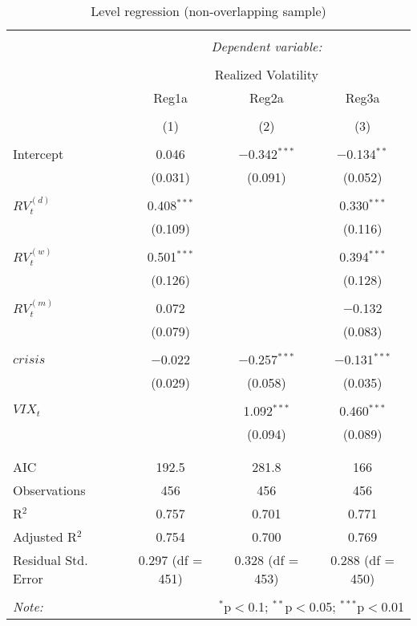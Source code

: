 
\begin{table}[!htbp] \centering 
  \caption{Level regression (non-overlapping sample)} 
  \label{overlap1} 
\begin{tabular}{@{\extracolsep{5pt}}lccc} 
\\[-1.8ex]\hline 
\hline \\[-1.8ex] 
 & \multicolumn{3}{c}{\textit{Dependent variable:}} \\ 
\cline{2-4} 
\\[-1.8ex] & \multicolumn{3}{c}{Realized Volatility} \\ 
 & Reg1a & Reg2a & Reg3a \\ 
\\[-1.8ex] & (1) & (2) & (3)\\ 
\hline \\[-1.8ex] 
 Intercept & 0.046 & $-$0.342$^{***}$ & $-$0.134$^{**}$ \\ 
  & (0.031) & (0.091) & (0.052) \\ 
  & & & \\ 
 $RV^{(d)}_{t}$ & 0.408$^{***}$ &  & 0.330$^{***}$ \\ 
  & (0.109) &  & (0.116) \\ 
  & & & \\ 
 $RV^{(w)}_{t}$ & 0.501$^{***}$ &  & 0.394$^{***}$ \\ 
  & (0.126) &  & (0.128) \\ 
  & & & \\ 
 $RV^{(m)}_{t}$ & 0.072 &  & $-$0.132 \\ 
  & (0.079) &  & (0.083) \\ 
  & & & \\ 
 $crisis$ & $-$0.022 & $-$0.257$^{***}$ & $-$0.131$^{***}$ \\ 
  & (0.029) & (0.058) & (0.035) \\ 
  & & & \\ 
 $VIX_{t}$ &  & 1.092$^{***}$ & 0.460$^{***}$ \\ 
  &  & (0.094) & (0.089) \\ 
  & & & \\ 
\hline \\[-1.8ex] 
AIC & 192.5 & 281.8 & 166 \\ 
Observations & 456 & 456 & 456 \\ 
R$^{2}$ & 0.757 & 0.701 & 0.771 \\ 
Adjusted R$^{2}$ & 0.754 & 0.700 & 0.769 \\ 
Residual Std. Error & 0.297 (df = 451) & 0.328 (df = 453) & 0.288 (df = 450) \\ 
\hline 
\hline \\[-1.8ex] 
\textit{Note:}  & \multicolumn{3}{r}{$^{*}$p$<$0.1; $^{**}$p$<$0.05; $^{***}$p$<$0.01} \\ 
\end{tabular} 
\end{table} 
